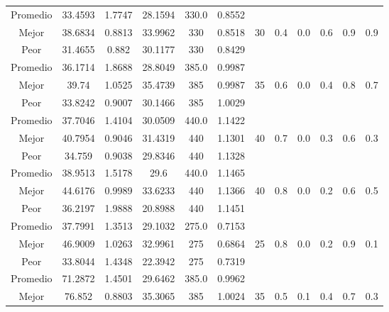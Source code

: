 \begin{table}[h!]
\begin{center}
\begin{tabular}{|c|c|c|c|c|c|c|c|c|c|c|c|}
        \hline
        \hline
            Promedio  & 33.4593 & 1.7747 & 28.1594 & 330.0 & 0.8552 &  &  &  &  &  & \\
            \cline{1-6}
            Mejor & 38.6834 & 0.8813  & 33.9962 & 330 & 0.8518 & 30 & 0.4 & 0.0 & 0.6 & 0.9 & 0.9\\
            \cline{1-6}
            Peor & 31.4655 & 0.882  & 30.1177 & 330 & 0.8429 &  &  &  &  &  & \\
        \hline
        \hline
            Promedio  & 36.1714 & 1.8688 & 28.8049 & 385.0 & 0.9987 &  &  &  &  &  & \\
            \cline{1-6}
            Mejor & 39.74 & 1.0525  & 35.4739 & 385 & 0.9987 & 35 & 0.6 & 0.0 & 0.4 & 0.8 & 0.7\\
            \cline{1-6}
            Peor & 33.8242 & 0.9007  & 30.1466 & 385 & 1.0029 &  &  &  &  &  & \\
        \hline
        \hline
            Promedio  & 37.7046 & 1.4104 & 30.0509 & 440.0 & 1.1422 &  &  &  &  &  & \\
            \cline{1-6}
            Mejor & 40.7954 & 0.9046  & 31.4319 & 440 & 1.1301 & 40 & 0.7 & 0.0 & 0.3 & 0.6 & 0.3\\
            \cline{1-6}
            Peor & 34.759 & 0.9038  & 29.8346 & 440 & 1.1328 &  &  &  &  &  & \\
        \hline
        \hline
            Promedio  & 38.9513 & 1.5178 & 29.6 & 440.0 & 1.1465 &  &  &  &  &  & \\
            \cline{1-6}
            Mejor & 44.6176 & 0.9989  & 33.6233 & 440 & 1.1366 & 40 & 0.8 & 0.0 & 0.2 & 0.6 & 0.5\\
            \cline{1-6}
            Peor & 36.2197 & 1.9888  & 20.8988 & 440 & 1.1451 &  &  &  &  &  & \\
        \hline
        \hline
            Promedio  & 37.7991 & 1.3513 & 29.1032 & 275.0 & 0.7153 &  &  &  &  &  & \\
            \cline{1-6}
            Mejor & 46.9009 & 1.0263  & 32.9961 & 275 & 0.6864 & 25 & 0.8 & 0.0 & 0.2 & 0.9 & 0.1\\
            \cline{1-6}
            Peor & 33.8044 & 1.4348  & 22.3942 & 275 & 0.7319 &  &  &  &  &  & \\
        \hline
        \hline
            Promedio  & 71.2872 & 1.4501 & 29.6462 & 385.0 & 0.9962 &  &  &  &  &  & \\
            \cline{1-6}
            Mejor & 76.852 & 0.8803  & 35.3065 & 385 & 1.0024 & 35 & 0.5 & 0.1 & 0.4 & 0.7 & 0.3\\

\end{tabular}
\end{center}
\end{table}
